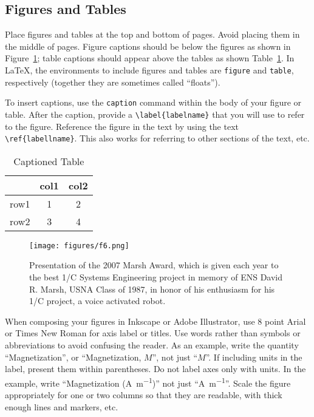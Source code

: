 \documentclass{wrcecapstone}
\begin{document}
\subsection{Figures and Tables}
Place figures and tables at the top and bottom of pages. Avoid placing them in the middle of pages. Figure captions should be below the figures as shown in Figure~\ref{f6}; table captions should appear above the tables as shown Table~\ref{t1}. In \LaTeX, the environments to include figures and tables are \lstinline{figure} and \lstinline{table}, respectively (together they are sometimes called ``floats''). 

To insert captions, use the \lstinline{caption} command within the body of your figure or table.  After the caption, provide a \lstinline|\label{labelname}| that you will use to refer to the figure.  Reference the figure in the text by using the text \lstinline|\ref{labellname}|.  This also works for referring to other sections of the text, etc. 

\begin{table}[hpt]
\caption{Captioned Table}
\label{t1}
\begin{center}
\begin{tabular}{lcc}
\toprule
 & col1 & col2 \\
\midrule
row1 & 1 & 2 \\
row2 & 3 & 4 \\
\bottomrule
\end{tabular}
\end{center}
\end{table}

\begin{figure}[hpb]
\begin{center}
\texttt{[image: figures/f6.png]}
\end{center}
\caption{Presentation of the 2007 Marsh Award, which is given each year to the best 1/C Systems Engineering project in memory of ENS David R.  Marsh, USNA Class of 1987, in honor of his enthusiasm for his 1/C project, a voice activated robot.}
\label{f6}
\end{figure}

When composing your figures in Inkscape or Adobe Illustrator, use 8 point Arial or Times New Roman for axis label or titles. Use words rather than symbols or abbreviations to avoid confusing the reader. As an example, write the quantity ``Magnetization'', or ``Magnetization, $M$'', not just ``$M$''. If including units in the label, present them within parentheses. Do not label axes only with units. In the example, write ``Magnetization (\si{\ampere\per\meter})'' not just ``\si{\ampere\per\meter}''. Scale the figure appropriately for one or two columns so that they are readable, with thick enough lines and markers, etc. 
\end{document}
